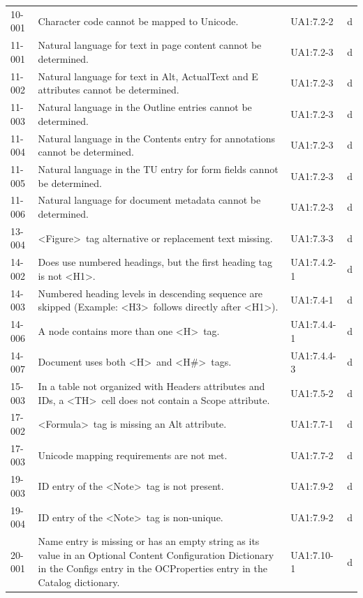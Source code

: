 \documentclass{book}
\begin{document}
\begin{tabular}{lp{5cm}lp{5cm}}
  10-001 & Character code cannot be mapped to Unicode. & UA1:7.2-2 & d\\
  11-001 & Natural language for text in page content cannot be determined. & UA1:7.2-3 & d\\
  11-002 & Natural language for text in Alt, ActualText and E attributes cannot be determined. & UA1:7.2-3 & d\\
  11-003 & Natural language in the Outline entries cannot be determined. & UA1:7.2-3 & d\\
  11-004 & Natural language in the Contents entry for annotations cannot be determined. & UA1:7.2-3 & d\\
  11-005 & Natural language in the TU entry for form fields cannot be determined. & UA1:7.2-3 & d\\
  11-006 & Natural language for document metadata cannot be determined. & UA1:7.2-3 & d\\
  13-004 & \textless Figure\textgreater\ tag alternative or replacement text missing. & UA1:7.3-3 & d\\
  14-002 & Does use numbered headings, but the first heading tag is not \textless H1\textgreater . & UA1:7.4.2-1 & d\\
  14-003 & Numbered heading levels in descending sequence are skipped (Example: \textless H3\textgreater\  follows directly after \textless H1\textgreater{}). & UA1:7.4-1 & d\\
  14-006 & A node contains more than one \textless H\textgreater\ tag. & UA1:7.4.4-1 & d\\
  14-007 & Document uses both \textless H\textgreater\ and \textless H\#\textgreater\ tags. & UA1:7.4.4-3 & d\\
  15-003 & In a table not organized with Headers attributes and IDs, a \textless TH\textgreater\ cell does not contain a Scope attribute. & UA1:7.5-2 & d\\
  17-002 & \textless Formula\textgreater\ tag is missing an Alt attribute. & UA1:7.7-1 & d\\
  17-003 & Unicode mapping requirements are not met. & UA1:7.7-2 & d\\
  19-003 & ID entry of the \textless Note\textgreater\ tag is not present. & UA1:7.9-2 & d\\
  19-004 & ID entry of the \textless Note\textgreater\ tag is non-unique. & UA1:7.9-2 & d\\
  20-001 & Name entry is missing or has an empty string as its value in an Optional Content Configuration Dictionary in the Configs entry in the OCProperties entry in the Catalog dictionary. & UA1:7.10-1 & d\\

\end{tabular}
\end{document}
